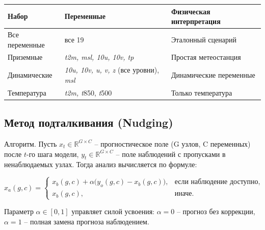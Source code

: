 \documentclass[14pt,a4paper]{extarticle}
\newcounter{none}
\numberwithin{table}{section}
\numberwithin{figure}{section}
\numberwithin{equation}{section}
\begin{document}
{\def\LTcaptype{none} %
\begin{longtable}[]{@{}
  >{\raggedright\arraybackslash}p{}
  >{\raggedright\arraybackslash}p{}
  >{\raggedright\arraybackslash}p{}@{}}
\toprule\noalign{}
\begin{minipage}[b]{\linewidth}\raggedright
Набор
\end{minipage} & \begin{minipage}[b]{\linewidth}\raggedright
Переменные
\end{minipage} & \begin{minipage}[b]{\linewidth}\raggedright
Физическая интерпретация
\end{minipage} \\
\midrule\noalign{}
\endhead
\bottomrule\noalign{}
\endlastfoot
Все переменные & все 19 & Эталонный сценарий \\
Приземные & \emph{t2m, msl, 10u, 10v, tp} & Простая метеостанция \\
Динамические & \emph{10u, 10v, u, v, z} (все уровни), \emph{msl} &
Динамические переменные \\
Температура & \emph{t2m, t}850, \emph{t}500 & Только температура \\
\end{longtable}
}

\subsection{Метод подталкивания (Nudging)}\label{ux43cux435ux442ux43eux434-ux43fux43eux434ux442ux430ux43bux43aux438ux432ux430ux43dux438ux44f-nudging}

Алгоритм. Пусть \(x_t \in \mathbb{R}^{G \times C}\) --
прогностическое поле (G узлов, C переменных) после \(t\)-го шага модели,
\(y_t \in \mathbb{R}^{G \times C}\) -- поле наблюдений с пропусками
в ненаблюдаемых узлах. Тогда анализ вычисляется по формуле:

\[x_a(g, c) = \begin{cases}
x_b(g,c) + \alpha \bigl(y_o(g,c) - x_b(g,c)\bigr), & \text{если наблюдение доступно}, \\
x_b(g,c), & \text{иначе}.
\end{cases}\]

Параметр \(\alpha \in [0, 1]\) управляет силой усвоения: \(\alpha = 0\)
-- прогноз без коррекции, \(\alpha = 1\) -- полная замена прогноза
наблюдением.
\end{document}
